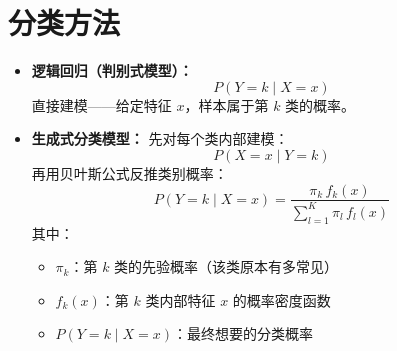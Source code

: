 \section{分类方法}
\begin{itemize}
    \item \textbf{逻辑回归（判别式模型）：}
    \[
    P(Y = k \mid X = x)
    \]
    直接建模——给定特征 $x$，样本属于第 $k$ 类的概率。

    \item \textbf{生成式分类模型：}
    先对每个类内部建模：
    \[
    P(X = x \mid Y = k)
    \]
    再用贝叶斯公式反推类别概率：
    \[
    P(Y = k \mid X = x) = \frac{\pi_k \, f_k(x)}{\displaystyle\sum_{l=1}^{K} \pi_l \, f_l(x)}
    \]
    其中：
    \begin{itemize}
        \item $\pi_k$：第 $k$ 类的先验概率（该类原本有多常见）
        \item $f_k(x)$：第 $k$ 类内部特征 $x$ 的概率密度函数
        \item $P(Y = k \mid X = x)$：最终想要的分类概率
    \end{itemize}
\end{itemize}

